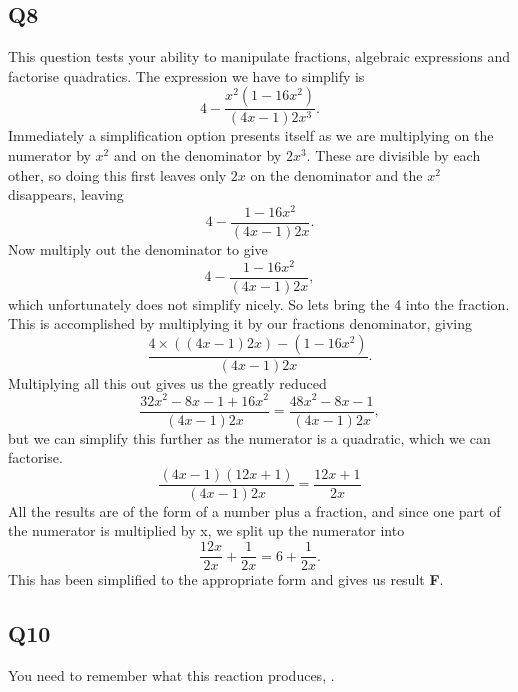 \documentclass[11pt]{article}
\begin{document}
\subsection*{Q8}
This question tests your ability to manipulate fractions, algebraic expressions and factorise quadratics.  The expression we have to simplify is 
\begin{equation*}
4-\frac{x^2(1-16x^2)}{(4x-1)2x^3}.
\end{equation*}
Immediately a simplification option presents itself as we are multiplying on the numerator by $x^2$ and on the denominator by $2x^3$.  These are divisible by each other, so doing this first leaves only $2x$ on the denominator and the $x^2$ disappears, leaving
\begin{equation*}
4-\frac{1-16x^2}{(4x-1)2x}.
\end{equation*}
Now multiply out the denominator to give 
\begin{equation*}
4-\frac{1-16x^2}{(4x-1)2x},
\end{equation*}
which unfortunately does not simplify nicely.  So lets bring the 4 into the fraction.  This is accomplished by multiplying it by our fractions denominator, giving
\begin{equation*}
\frac{4 \times ((4x-1)2x) - (1-16x^2)}{(4x-1)2x}.
\end{equation*}
Multiplying all this out gives us the greatly reduced
\begin{equation*}
\frac{32x^2 - 8x - 1 + 16x^2}{(4x-1)2x} = \frac{48x^2 - 8x - 1 }{(4x-1)2x},
\end{equation*}
but we can simplify this further as the numerator is a quadratic, which we can factorise.
\begin{equation*}
\frac{(4x-1)(12x+1)}{(4x-1)2x} = \frac{12x+1}{2x}
\end{equation*} 
All the results are of the form of a number plus a fraction, and since one part of the numerator is multiplied by x, we split up the numerator into
\begin{equation*}
\frac{12x}{2x} + \frac{1}{2x} = 6 + \frac{1}{2x}.
\end{equation*}
This has been simplified to the appropriate form and gives us result \textbf{F}.

\subsection*{Q10}
You need to remember what this reaction produces, .
\end{document}
